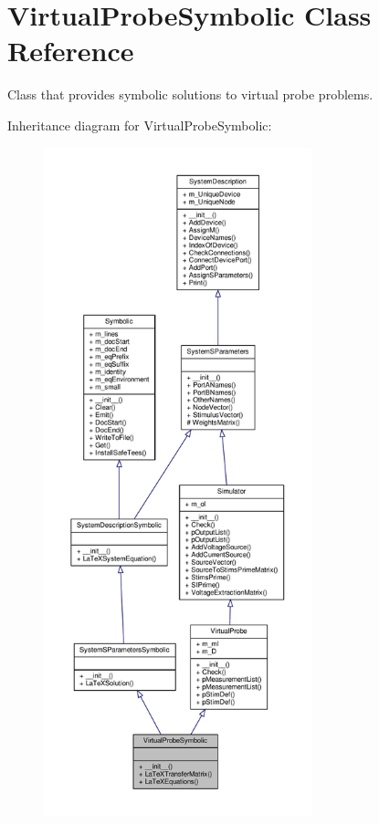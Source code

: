 \hypertarget{classSignalIntegrity_1_1SystemDescriptions_1_1VirtualProbeSymbolic_1_1VirtualProbeSymbolic}{}\section{Virtual\+Probe\+Symbolic Class Reference}
\label{classSignalIntegrity_1_1SystemDescriptions_1_1VirtualProbeSymbolic_1_1VirtualProbeSymbolic}


Class that provides symbolic solutions to virtual probe problems.  




Inheritance diagram for Virtual\+Probe\+Symbolic\+:\nopagebreak
\begin{figure}[H]
\begin{center}
\leavevmode
\includegraphics[height=550pt]{classSignalIntegrity_1_1SystemDescriptions_1_1VirtualProbeSymbolic_1_1VirtualProbeSymbolic__inherit__graph}
\end{center}
\end{figure}


